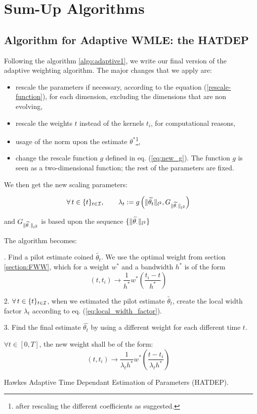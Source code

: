 \section{Sum-Up Algorithms}
\subsection{Algorithm for Adaptive WMLE: the HATDEP}
Following the algorithm \ref{algo:adaptive1}, we write our final version of the adaptive weighting algorithm. The major changes that we apply are:

\begin{itemize}
\item rescale the parameters if necessary, according to the equation (\ref{rescale-function}), for each dimension, excluding the dimensions that are non evolving,
\item rescale the weights $t$ instead of the kernels $t_i$, for computational reasons,
\item usage of the norm upon the estimate $\theta^*$\footnote{after rescaling the different coefficients as suggested.},
\item change the rescale function $g$ defined in eq. (\ref{eq:new_g}). The function $g$ is seen as a two-dimensional function; the rest of the parameters are fixed.
\end{itemize}


We then get the new scaling parameters:


\begin{equation}
\forall t \in \sequencetime, \qquad \lambda_{t} :=  
g \left (\norm{\widetilde{\theta_{t}}}_{l^2}, 
G_{\norm{\widetilde{\theta_{\cdot}}}_{l^2}} \right)   
\end{equation}

and  $ G_{\lVert \widetilde{\theta_{\cdot}}\rVert_{l^2}} $ is based upon the sequence $\{ \lVert \widetilde{\theta_{\cdot}}\rVert_{l^2} \} $


The algorithm becomes:


\begin{algorithm}[H]
\label{algo:adaptive2}
. \quad Find a pilot estimate coined $\widetilde{\theta_t}$. We use the optimal weight from section \ref{section:FWW}, which for a weight $w^*$ and a bandwidth $h^*$ is of the form  $$ (t, t_i) \to \frac 1 {h^*} w^* \left ( \frac{t_i - t }{h^*} \right ) $$ 

2. \quad $\forall t \in \sequencetime$, when we estimated the pilot estimate $\widetilde{\theta_t}$, create the local width factor $\lambda_t$ according to eq. (\ref{eq:local_width_factor}). 

3. \quad Find the final estimate $\hat{\theta_t}$ by using a different weight for each different time $t$. 

$\forall t \in [0,T]$, the new weight shall be of the form:
$$ (t, t_i) \to \frac 1 {\lambda_{t} h^*} w^* \left ( \frac{t - t_i}{\lambda_{t} h^*} \right )$$ 
\caption{Hawkes Adaptive Time Dependant Estimation of Parameters (HATDEP).}
\end{algorithm}


